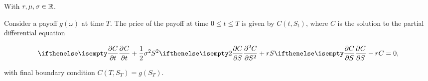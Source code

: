 \documentclass[../TGMAFFIRO.tex]{subfiles}
\begin{document}
With $r, \mu, \sigma \in \mathbb{R}$.

\begin{theorem}
	Consider a payoff $g(\omega)$ at time $T$. The price of the payoff at time $0\leq t\leq T$ is given by $C(t,S_t)$, where $C$ is the solution to the partial differential equation
	
	\begin{equation}\label{eq:black-scholes-formula}
		\partialwrt{C}{t} + \frac{1}{2}\sigma^2S^2\partialwrt[2]{C}{S} + rS\partialwrt{C}{S} - rC = 0,
	\end{equation}

with final boundary condition $C(T,S_T) = g(S_T)$.
\end{theorem}

\end{document}
